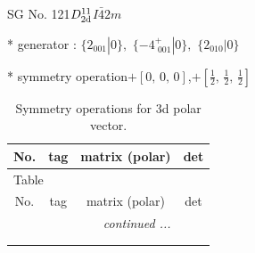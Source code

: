 \documentclass[fleqn,8pt]{jsarticle}
\begin{document}
\setcounter{MaxMatrixCols}{32}

\renewcommand{\tablename}{Table~}
\renewcommand{\figurename}{Figure~}
\begin{center}
\LARGE
SG No. 121\quad$D_{\rm 2d}^{11}$\quad$I\bar{4}2m$\quad[ tetragonal ]
\end{center}

* generator : $\{2{}_{001}|0\},\,\,\{-4^{+}_{\,\,001}|0\},\,\,\{2{}_{010}|0\}$

* symmetry operation\quad$+\left[ 0,\, 0,\, 0 \right]$,\quad $+\left[ \frac{1}{2},\, \frac{1}{2},\, \frac{1}{2} \right]$
\renewcommand{\arraystretch}{1.3}
\begin{longtable}{cccc}
\caption{Symmetry operations for 3d polar vector.}
 \\
 \hline \hline
No. & tag & matrix (polar) & det \\ \hline \endfirsthead

\multicolumn{3}{l}{\tablename\ \thetable{}} \\
 \hline \hline
No. & tag & matrix (polar) & det \\ \hline \endhead

 \hline \hline
\multicolumn{3}{r}{\footnotesize\it continued ...} \\ \endfoot

 \hline \hline
\multicolumn{3}{r}{} \\ \endlastfoot


\end{longtable}
\end{document}
